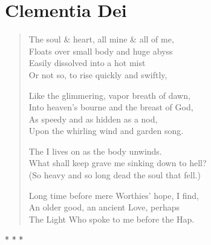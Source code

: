 \section{Clementia Dei}

\enlargethispage{2em}
\thispagestyle{empty}
\begin{verse}
The soul \& heart, all mine \& all of me,\\
Floats over small body and huge abyss\\
Easily dissolved into a hot mist\\
Or not so, to rise quickly and swiftly,

Like the glimmering, vapor breath of dawn,\\
Into heaven's bourne and the breast of God,\\
As speedy and as hidden as a nod,\\
Upon the whirling wind and garden song.

The I lives on as the body unwinds.\\
What shall keep grave me sinking down to hell?\\
(So heavy and so long dead the soul that fell.)

Long time before mere Worthies' hope, I find,\\
An older good, an ancient Love, perhaps\\
The Light Who spoke to me before the Hap.
\end{verse}



\begin{center}* * *\end{center}


